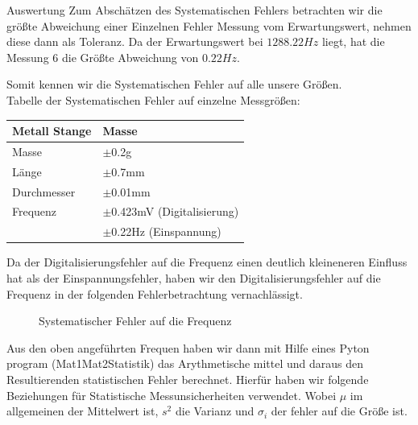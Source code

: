 \documentclass[twoside]{protokoll}
\begin{document}
\begin{aufgabe}{Auswertung}
Zum Abschätzen des Systematischen Fehlers betrachten wir die größte Abweichung einer Einzelnen Fehler Messung vom Erwartungswert, nehmen diese dann als Toleranz.
Da der Erwartungswert bei $1288.22 Hz$ liegt, hat die Messung 6 die Größte Abweichung von $0.22 Hz$.

Somit kennen wir die Systematischen Fehler auf alle unsere Größen.\\


Tabelle der Systematischen Fehler auf einzelne Messgrößen: 

\begin{table}[H]
    \centering
    \begin{tabularx}{0.8\textwidth}{X l} %
        \toprule
        \textbf{Metall Stange} & \textbf{Masse} \\
        \midrule
        Masse & $\pm$0.2g \\
        Länge & $\pm$0.7mm\\
        Durchmesser & $\pm$0.01mm \\
        Frequenz & $\pm$0.423mV (Digitalisierung)\\
        & $\pm$0.22Hz (Einspannung) \\
        \bottomrule
    \end{tabularx}
    \label{tab:mytable}
\end{table}

Da der Digitalisierungsfehler auf die Frequenz einen deutlich kleineneren Einfluss hat als der Einspannungsfehler, haben wir den Digitalisierungsfehler auf die Frequenz in der folgenden Fehlerbetrachtung vernachlässigt.

\begin{figure}[H]
  \centering
    \caption{Systematischer Fehler auf die Frequenz}
  \hfill
\end{figure}
\begin{figure}[H]
  \centering
  \hfill
\end{figure}
 
Aus den oben angeführten Frequen haben wir dann mit Hilfe eines Pyton program (Mat1Mat2Statistik) das Arythmetische mittel und daraus den Resultierenden statistischen Fehler berechnet. Hierfür haben wir folgende Beziehungen für Statistische Messunsicherheiten verwendet. Wobei $\mu$ im allgemeinen der Mittelwert ist, $s^2$ die Varianz und $\sigma_i$ der fehler auf die Größe ist.


\end{aufgabe}
\end{document}
